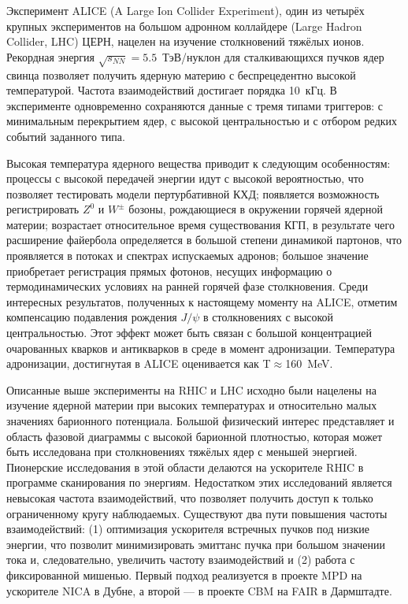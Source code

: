 Эксперимент ALICE (A Large Ion Collider Experiment), один из четырёх крупных экспериментов на большом адронном коллайдере (Large Hadron Collider, LHC) ЦЕРН, нацелен на изучение столкновений тяжёлых ионов. Рекордная энергия $\sqrt{s_{NN}}=5.5$~\mbox{ТэВ/нуклон} для сталкивающихся пучков ядер свинца позволяет получить ядерную материю с беспрецедентно высокой температурой. Частота взаимодействий достигает порядка 10~кГц. В эксперименте одновременно сохраняются данные с тремя типами триггеров: с минимальным перекрытием ядер, с высокой центральностью и с отбором редких событий заданного типа.

Высокая температура ядерного вещества приводит к следующим особенностям: процессы с высокой передачей энергии идут с высокой вероятностью, что позволяет тестировать модели пертурбативной КХД; появляется возможность регистрировать $Z^{0}$ и $W^{\pm}$ бозоны, рождающиеся в окружении горячей ядерной материи; возрастает относительное время существования КГП, в результате чего расширение файербола определяется в большой степени динамикой партонов, что проявляется в потоках и спектрах испускаемых адронов; большое значение приобретает регистрация прямых фотонов, несущих информацию о термодинамических условиях на ранней горячей фазе столкновения. Среди интересных результатов, полученных к настоящему моменту на ALICE, отметим компенсацию подавления рождения $J/\psi$ в столкновениях с высокой центральностью. Этот эффект может быть связан с большой концентрацией очарованных кварков и антикварков в среде в момент адронизации. Температура адронизации, достигнутая в ALICE оценивается как T$\approx$160~MeV.

\bigskip

%


Описанные выше эксперименты на RHIC и LHC исходно были нацелены на изучение ядерной материи при высоких температурах и относительно малых значениях барионного потенциала. Большой физический интерес представляет и область фазовой диаграммы с высокой барионной плотностью, которая может быть исследована при столкновениях тяжёлых ядер с меньшей энергией. Пионерские исследования в этой области делаются на ускорителе RHIC в программе сканирования по энергиям. Недостатком этих исследований является невысокая частота взаимодействий, что позволяет получить доступ к только ограниченному кругу наблюдаемых. Существуют два пути повышения частоты взаимодействий: (1) оптимизация ускорителя встречных пучков под низкие энергии, что позволит минимизировать эмиттанс пучка при большом значении тока и, следовательно, увеличить частоту взаимодействий и (2) работа с фиксированной мишенью. Первый подход реализуется в проекте MPD на ускорителе NICA в Дубне, а второй --- в проекте CBM на FAIR в Дармштадте.

